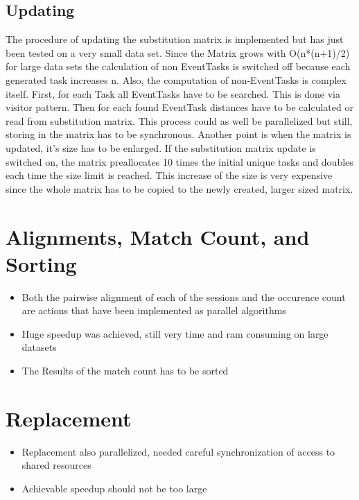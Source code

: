 \subsection{Updating}
	The procedure of updating the substitution matrix is implemented but has just been tested on a very small data set. 
	Since the Matrix grows with O(n*(n+1)/2) for large data sets the calculation of non EventTasks is switched off because each generated task increases n.
	Also, the computation of non-EventTasks is complex itself. First, for each Task all EventTasks have to be searched. This is done via visitor pattern. 
	Then for each found EventTask distances have to be calculated or read from substitution matrix.
	This process could as well be parallelized but still, storing in the matrix has to be synchronous. 
	Another point is when the matrix is updated, it's size has to be enlarged. If the substitution matrix update is switched on, the matrix preallocates 10 times the initial unique tasks and doubles each time the size limit is reached.
	This increase of the size is very expensive since the whole matrix has to be copied to the newly created, larger sized matrix.

\section{Alignments, Match Count, and Sorting}
\begin{itemize}
	\item Both the pairwise alignment of each of the sessions and the occurence count are actions that have been implemented as parallel algorithms
	\item Huge speedup was achieved, still very time and ram consuming on large datasets
	\item The Results of the match count has to be sorted
\end{itemize}

\section{Replacement}
\begin{itemize}
	\item Replacement also parallelized, needed careful synchronization of access to shared resources
	\item Achievable speedup should not be too large
\end{itemize}


